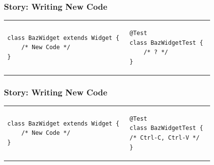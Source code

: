 \documentclass{beamer}
\begin{document}
\begin{frame}[fragile]
  \frametitle{Story: Writing New Code}
     \begin{tabular}{ll}
        \begin{minipage}{0.4\textwidth}
\begin{lstlisting}[]
class BazWidget extends Widget { 
    /* New Code */ 
}
\end{lstlisting}
        \end{minipage}
        &
        \begin{minipage}{0.4\textwidth}
\begin{lstlisting}[]
@Test
class BazWidgetTest { 
    /* ? */ 
}
\end{lstlisting}
        \end{minipage}
     \end{tabular}
  
\end{frame}

\begin{frame}[fragile]
  \frametitle{Story: Writing New Code}
     \begin{tabular}{ll}
        \begin{minipage}{0.4\textwidth}
\begin{lstlisting}[]
class BazWidget extends Widget { 
    /* New Code */ 
}
\end{lstlisting}
        \end{minipage}
        &
        \begin{minipage}{0.4\textwidth}
\begin{lstlisting}[]
@Test
class BazWidgetTest { 
/* Ctrl-C, Ctrl-V */ 
}
\end{lstlisting}
        \end{minipage}
     \end{tabular}
\end{frame}
\end{document}

